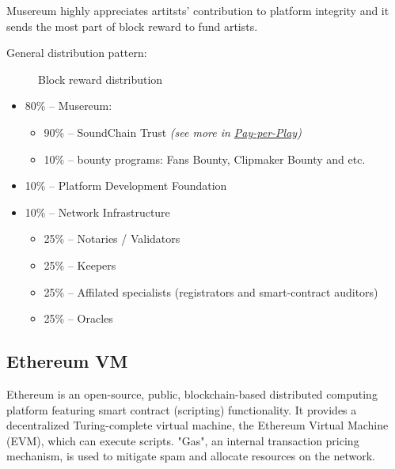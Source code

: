\documentclass[12pt]{report}
\newcommand{\hlc}[1]{\colorbox{yellow!25}{#1}}
\begin{document}
Musereum highly appreciates artitsts' contribution to platform integrity and it sends the most part of block reward to fund artists.

General distribution pattern:

\def\Musereum{Musereum}
\def\Development{Platform Development}
\def\Infrastructure{Infrastructure}

\begin{figure}[h]
\centering
\caption{Block reward distribution}
\vspace{20pt}
\end{figure}

\begin{itemize}
	\item 80\% – Musereum:
	\begin{itemize}
		\item 90\% – SoundChain Trust \textit{(see more in \hyperref[tech-apps-soundchain-payperplay]{Pay-per-Play})}
		\item 10\% – bounty programs: Fans Bounty, Clipmaker Bounty and etc.
	\end{itemize}
	\item 10\% – Platform Development Foundation
	\item 10\% – \hlc{Network Infrastructure}
	\begin{itemize}
		\item 25\% – Notaries / Validators
		\item 25\% – \hlc{Keepers}
		\item 25\% – Affilated specialists (\hlc{registrators} and smart-contract auditors)
		\item 25\% – Oracles
	\end{itemize}
\end{itemize}


\subsection{Ethereum VM}
\label{tech-blockchain-evm}
Ethereum is an open-source, public, blockchain-based distributed computing platform featuring smart contract (scripting) functionality. It provides a decentralized Turing-complete virtual machine, the Ethereum Virtual Machine (EVM), which can execute scripts. "Gas", an internal transaction pricing mechanism, is used to mitigate spam and allocate resources on the network.
\end{document}

